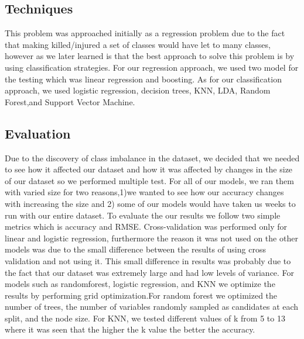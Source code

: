 \documentclass[conference]{IEEEtran}
\begin{document}
	\subsection{Techniques}
		This problem was approached initially as a regression problem due to the fact that making killed/injured a set of classes would have let to many classes, however as we later learned is that the best approach to solve this problem is by using classification strategies. For our regression approach, we used two model for the testing which was linear regression and boosting. As for our classification approach, we used logistic regression, decision trees, KNN, LDA, Random Forest,and Support Vector Machine.
	\subsection{Evaluation}
		Due to the discovery of class imbalance in the dataset, we decided that we needed to see how it affected our dataset and how it was affected by changes in the size of our dataset so we performed multiple test. For all of our models, we ran them with varied size for two reasons,1)we wanted to see how our accuracy changes with increasing the size  and 2) some of our models would have taken us weeks to run with our entire dataset. To evaluate the our results we follow two simple metrics which is accuracy and RMSE. Cross-validation was performed only for linear and logistic regression, furthermore the reason it was not used on the other models was due to the small difference between the results of using cross validation and not using it. This small difference in results was probably due to the fact that our dataset was extremely large and had low levels of variance.
		For models such as randomforest, logistic regression, and KNN we optimize the results by performing grid optimization.For random forest we optimized the number of trees, the number of variables randomly sampled as candidates at each split, and the node size. For KNN, we tested different values of k from 5 to 13 where it was seen that the higher the k value the better the accuracy.
\end{document}
